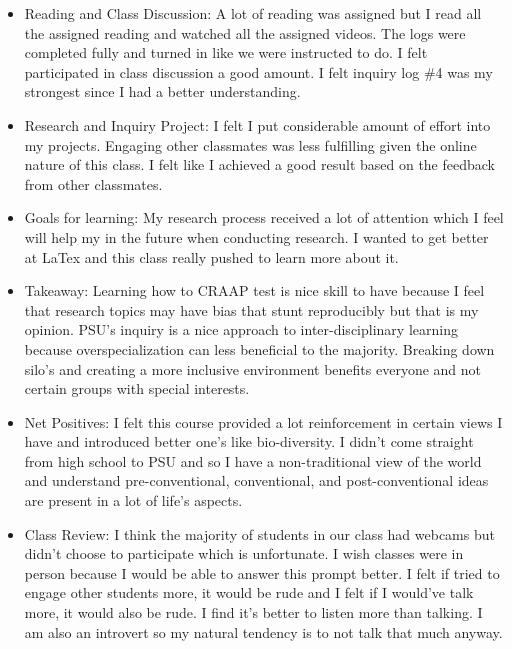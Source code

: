 \documentclass{article}
\begin{document}
\begin{enumerate}
\begin{itemize}
        \item Reading and Class Discussion: A lot of reading was assigned but I read all the assigned reading and watched all the assigned videos. The logs were completed fully and turned in like we were instructed to do. I felt participated in class discussion a good amount. I felt inquiry log \#4 was my strongest since I had a better understanding.

        \item Research and Inquiry Project: I felt I put considerable amount of effort into my projects. Engaging other classmates was less fulfilling given the online nature of this class. I felt like I achieved a good result based on the feedback from other classmates. 

        \item Goals for learning: My research process received a lot of attention which I feel will help my in the future when conducting research. I wanted to get better at LaTex and this class really pushed to learn more about it.

        \item Takeaway: Learning how to CRAAP test is nice skill to have because I feel that research topics may have bias that stunt reproducibly but that is my opinion. PSU's inquiry is a nice approach to inter-disciplinary learning because overspecialization can less beneficial to the majority. Breaking down silo's and creating a more inclusive environment benefits everyone and not certain groups with special interests.

        \item Net Positives: I felt this course provided a lot reinforcement in certain views I have and introduced better one's like bio-diversity. I didn't come straight from high school to PSU and so I have a non-traditional view of the world and understand pre-conventional, conventional, and post-conventional ideas are present in a lot of life's aspects. 

        \item Class Review: I think the majority of students in our class had webcams but didn't choose to participate which is unfortunate. I wish classes were in person because I would be able to answer this prompt better. I felt if tried to engage other students more, it would be rude and I felt if I would've talk more, it would also be rude. I find it's better to listen more than talking. I am also an introvert so my natural tendency is to not talk that much anyway.


\end{itemize}
\end{enumerate}
\end{document}
